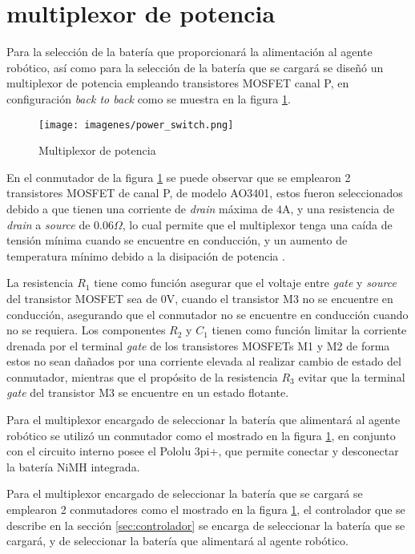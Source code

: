 \section{multiplexor de potencia}

    Para la selección de la batería que proporcionará la alimentación al agente
    robótico, así como para la selección de la batería que se cargará se diseñó
    un multiplexor de potencia empleando transistores MOSFET canal P, en 
    configuración \textit{back to back} como se muestra en la figura \ref{fig:power_switch}.

    \begin{figure}[H]
        \centering
        \texttt{[image: imagenes/power\_switch.png]}
        \caption{Multiplexor de potencia}
        \label{fig:power_switch}
    \end{figure}

    En el conmutador de la figura \ref{fig:power_switch} se puede observar que se
    emplearon 2 transistores MOSFET de canal P, de modelo AO3401, estos fueron
    seleccionados debido a que tienen una corriente de \textit{drain} máxima de
    $4\text{A}$, y una resistencia de \textit{drain} a \textit{source} de 
    $0.06\Omega$, lo cual permite que el multiplexor tenga una caída de tensión
    mínima cuando se encuentre en conducción, y un aumento de temperatura mínimo
    debido a la disipación de potencia \cite{a_AO3401}.

    La resistencia $R_1$ tiene como función asegurar que el voltaje 
    entre \textit{gate} y \textit{source} del transistor MOSFET sea de $0\text{V}$,
    cuando el transistor M3 no se encuentre en conducción, asegurando que 
    el conmutador no se encuentre en conducción cuando no se requiera. Los componentes 
    $R_2$ y $C_1$ tienen como función limitar la corriente drenada por el terminal \textit{gate} de
    los transistores MOSFETs M1 y M2 de forma estos no sean dañados por una corriente
    elevada
    al realizar cambio de estado del conmutador, mientras que el propósito
    de la resistencia $R_3$ evitar que la terminal \textit{gate} del transistor
    M3 se encuentre en un estado flotante.

    Para el multiplexor encargado de seleccionar la batería que alimentará al
    agente robótico se utilizó un conmutador como el mostrado en la figura
    \ref{fig:power_switch}, en conjunto con el circuito interno posee el 
    Pololu 3pi+, que permite conectar y desconectar la batería NiMH integrada.

    Para el multiplexor encargado de seleccionar la batería que se cargará se
    emplearon 2 conmutadores como el mostrado en la figura \ref{fig:power_switch},
    el controlador que se describe en la sección \ref{sec:controlador} se encarga
    de seleccionar la batería que se cargará, y de seleccionar la batería que
    alimentará al agente robótico.


